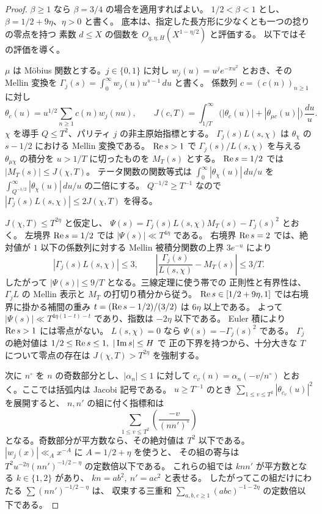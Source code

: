 \begin{proof}
\(\beta\ge1\) なら \(\beta=3/4\) の場合を適用すればよい。
\(1/2<\beta<1\) とし、\(\beta=1/2+9\eta\)、\(\eta>0\) と書く。
底本は、指定した長方形に少なくとも一つの捻りの零点を持つ
素数 \(d\le X\) の個数を \(O_{q,\eta,H}(X^{1-\eta/2})\) と評価する。
以下ではその評価を導く。

\(\mu\) は Möbius 関数とする。\(j\in\{0,1\}\) に対し
\(w_j(u)=u^j e^{-\pi u^2}\) とおき、その Mellin 変換を
\(\Gamma_j(s)=\int_0^\infty w_j(u)u^{s-1}\,du\) と書く。
係数列 \(c=(c(n))_{n\ge1}\) に対し
\[
 \theta_c(u)=u^{1/2}\sum_{n\ge1}c(n)w_j(nu),\qquad
 J(c,T)=\int_{1/T}^\infty
        \bigl(|\theta_c(u)|+|\theta_{\mu c}(u)|\bigr)\,\frac{du}{u}.
\]
\(\chi\) を導手 \(Q\le T^2\)、パリティ \(j\) の非主原始指標とする。
\(\Gamma_j(s)L(s,\chi)\) は \(\theta_\chi\) の \(s-1/2\) における Mellin 変換である。
\(\operatorname{Re} s>1\) で \(\Gamma_j(s)/L(s,\chi)\) を与える \(\theta_{\mu\chi}\) の積分を
\(u>1/T\) に切ったものを \(M_T(s)\) とする。
\(\operatorname{Re} s=1/2\) では \(|M_T(s)|\le J(\chi,T)\)。
テータ関数の関数等式は
\(\int_0^\infty |\theta_\chi(u)|\,du/u\) を
\(\int_{Q^{-1/2}}^\infty|\theta_\chi(u)|\,du/u\) の二倍にする。
\(Q^{-1/2}\ge T^{-1}\) なので
\(|\Gamma_j(s)L(s,\chi)|\le2J(\chi,T)\) を得る。

\(J(\chi,T)\le T^{2\eta}\) と仮定し、
\(\Psi(s)=\Gamma_j(s)L(s,\chi)M_T(s)-\Gamma_j(s)^2\) とおく。
左境界 \(\operatorname{Re} s=1/2\) では \(|\Psi(s)|\ll T^{4\eta}\) である。
右境界 \(\operatorname{Re} s=2\) では、絶対値が \(1\) 以下の係数列に対する
Mellin 被積分関数の上界 \(3e^{-u}\) により
\[
 |\Gamma_j(s)L(s,\chi)|\le3,\qquad
 \left|\frac{\Gamma_j(s)}{L(s,\chi)}-M_T(s)\right|\le 3/T.
\]
したがって \(|\Psi(s)|\le 9/T\) となる。三線定理に使う帯での
正則性と有界性は、\(\Gamma_j L\) の Mellin 表示と \(M_T\) の打切り積分から従う。
\(\operatorname{Re} s\in[1/2+9\eta,1]\) では右境界に掛かる補間の重み
\(t=(\operatorname{Re} s-1/2)/(3/2)\) は \(6\eta\) 以上である。
よって \(|\Psi(s)|\ll T^{4\eta(1-t)-t}\) であり、指数は \(-2\eta\) 以下である。
Euler 積により \(\operatorname{Re} s>1\) には零点がない。
\(L(s,\chi)=0\) なら \(\Psi(s)=-\Gamma_j(s)^2\) である。
\(\Gamma_j\) の絶対値は \(1/2\le\operatorname{Re} s\le1,\ |\operatorname{Im} s|\le H\) で
正の下界を持つから、十分大きな \(T\) について零点の存在は
\(J(\chi,T)>T^{2\eta}\) を強制する。

次に \(n^\circ\) を \(n\) の奇数部分とし、\(|\alpha_n|\le1\) に対して
\(c_v(n)=\alpha_n(-v/n^\circ)\) とおく。ここでは括弧内は Jacobi 記号である。
\(u\ge T^{-1}\) のとき \(\sum_{1\le v\le T^2}|\theta_{c_v}(u)|^2\) を展開すると、
\(n,n'\) の組に付く指標和は
\[
  \sum_{1\le v\le T^2}\left(\frac{-v}{(nn')^\circ}\right)
\]
となる。奇数部分が平方数なら、その絶対値は \(T^2\) 以下である。
\(|w_j(x)|\ll_A x^{-A}\) に \(A=1/2+\eta\) を使うと、
その組の寄与は \(T^2u^{-2\eta}(nn')^{-1/2-\eta}\) の定数倍以下である。
これらの組では \(k nn'\) が平方数となる \(k\in\{1,2\}\) があり、
\(kn=ab^2,\ n'=ac^2\) と表せる。
したがってこの組だけにわたる \(\sum(nn')^{-1/2-\eta}\) は、
収束する三重和 \(\sum_{a,b,c\ge1}(abc)^{-1-2\eta}\) の定数倍以下である。


\end{proof}
